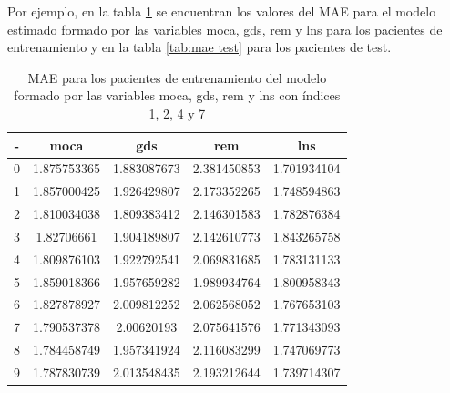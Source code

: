 Por ejemplo, en la tabla \ref{tab:mae train} se encuentran los valores del MAE para el modelo estimado formado por las variables moca, gds, rem y lns para los pacientes de entrenamiento y en la tabla \ref{tab:mae test} para los pacientes de test.

\begin{table}[htbp]
	\centering
	\begin{tabular}{|c|c|c|c|c|}
		\hline
		-& moca & gds & rem & lns \\
		\hline
		0 & 1.875753365 & 1.883087673 & 2.381450853 & 1.701934104 \\
		1 & 1.857000425 & 1.926429807 & 2.173352265 & 1.748594863 \\
		2 & 1.810034038 & 1.809383412 & 2.146301583 & 1.782876384 \\
		3 & 1.82706661 & 1.904189807 & 2.142610773 & 1.843265758 \\
		4 & 1.809876103 & 1.922792541 & 2.069831685 & 1.783131133 \\
		5 & 1.859018366 & 1.957659282 & 1.989934764 & 1.800958343 \\
		6 & 1.827878927 & 2.009812252 & 2.062568052 & 1.767653103 \\
		7 & 1.790537378 & 2.00620193 & 2.075641576 & 1.771343093 \\
		8 & 1.784458749 & 1.957341924 & 2.116083299 & 1.747069773 \\
		9 & 1.787830739 & 2.013548435 & 2.193212644 & 1.739714307 \\
		\hline
	\end{tabular}
	\caption{MAE para los pacientes de entrenamiento del modelo formado por las variables moca, gds, rem y lns con índices 1, 2, 4 y 7}
	\label{tab:mae train}
\end{table}

